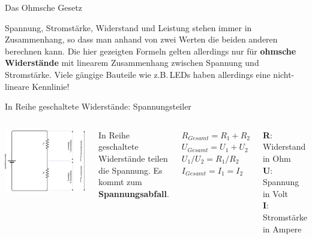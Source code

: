 \begin{frame}{Das Ohmsche Gesetz}
    \bigskip

    \parbox{\linewidth}{
        \footnotesize
        Spannung, Stromstärke, Widerstand und Leistung stehen immer in Zusammenhang,
        so dass man anhand von zwei Werten die beiden anderen berechnen kann.
        Die hier gezeigten Formeln gelten allerdings nur für \textbf{ohmsche Widerstände}
        mit linearem Zusammenhang zwischen Spannung und Stromstärke. Viele gängige Bauteile
        wie z.B.\,LEDs haben allerdings eine nicht-lineare Kennlinie!
    }
\end{frame}

{
\small

\begin{frame}{In Reihe geschaltete Widerstände: Spannungsteiler}
    \begin{columns}
        \includegraphics[width=\textwidth]{2-hardwaredesign/img/spannungsteiler}

        In Reihe geschaltete Widerstände teilen die Spannung.
        Es kommt zum \textbf{Spannungsabfall}.

        \bigskip
        \bigskip

        $R_{Gesamt} = R_1 + R_2$ \\
        \smallskip
        $U_{Gesamt} = U_1 + U_2$ \\
        \smallskip
        $U_1 / U_2 = R_1 / R_2$ \\
        \smallskip
        $I_{Gesamt} = I_1 = I_2$ \\

        \bigskip
        \bigskip

        \textbf{R}: Widerstand in Ohm \\
        \smallskip
        \textbf{U}: Spannung in Volt \\
        \smallskip
        \textbf{I}: Stromstärke in Ampere \\
    \end{columns}
\end{frame}
}

